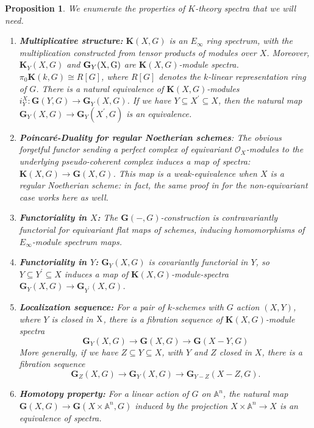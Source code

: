 \documentclass[11pt]{article}
\newcommand\mb{\mathbb}
\def \bG{\mathbf G}
\def \bK{\mathbf K}
\def \O{\mathcal O}
\def \rmX{\rm X}
\newcommand\mfk{\mathbf G}
\newtheorem{Proposition}{Proposition}[section]
\begin{document}
\begin{Proposition}\label{kproperties} We enumerate the properties of $K$-theory spectra that we will need.
\begin{enumerate}[label=(\arabic*), font=\upshape]
    \item{{\bf Multiplicative structure:} \label{relequiv}$\bK(X, G)$ is an $E_{\infty}$ ring spectrum, with the multiplication constructed from tensor products of modules over $X$.  Moreover, $\bK_Y(X, G) $ and $\bG_{Y}(\rmX, G)$  are  $\bK(X, G)$-module spectra.   $\pi _0 \bK(k, G) \cong R[G]$, where $R[G]$ denotes the $k$-linear representation ring of $G$. There is a natural equivalence  of $\bK(X, G)$-modules $i_Y^X: \mfk(Y, G) \rightarrow \mfk_Y(X, G)$. If we have $Y \subseteq X^{\prime} \subseteq X$, then the natural map $\mfk_Y(X, G) \rightarrow \mfk_Y(X^{\prime}, G)$ is an equivalence. }
    \item{{\bf Poincar\'e-Duality for regular Noetherian schemes}: The obvious forgetful functor sending a perfect complex
    of equivariant $\O_X$-modules to the underlying pseudo-coherent complex induces a map of spectra:
    $\bK(X, G) \rightarrow \mfk(X, G)$. This map is a weak-equivalence when $X$ is a regular Noetherian scheme:
    in fact, the same proof in \cite[3.21 Theorem]{TT} for the non-equivariant case works here as well.}
    \item{{\bf Functoriality in $X$:} The $\mfk(-, G)$-construction is contravariantly functorial for equivariant flat maps of schemes, inducing homomorphisms of $E_{\infty}$-module spectrum maps.   }
    \item{{\bf Functoriality in $Y$:} $\mfk_Y(X, G)$ is covariantly functorial in $Y$, so $Y \subseteq Y^{\prime} \subseteq X$ induces a  map of $\bK(X, G)$-module-spectra  $\mfk_Y(X, G) \rightarrow  \mfk_{Y^{\prime}}(X, G)$.  }
    \item{{\bf Localization sequence:} \label{excisionintro} For a pair of $k$-schemes with $G$ action $(X,Y)$, where $Y$ is closed in $\rmX$, there is a fibration sequence of $\bK(X, G)$-module spectra 
    $$ \mfk_Y(X, G) \rightarrow \mfk(X , G) \rightarrow \mfk(X - Y, G) 
    $$ More generally, if we have $Z \subseteq Y \subseteq X$, with $Y$ and $Z$ closed in $X$, there is a fibration sequence 
    $$ \bG_Z(X, G) \rightarrow \bG_Y (X, G) \rightarrow \bG_{Y-Z} (X-Z, G).
    $$}
    \item{{\bf Homotopy property:} For a linear action of $G$ on $\mb{A}^n$, the natural map $\mfk(X, G) \rightarrow \mfk(X \times \mb{A}^n, G)$ induced by the projection $X \times \mb{A}^n\rightarrow X  $ is an equivalence of spectra.  }
    

\end{enumerate}
\end{Proposition}
\end{document}

